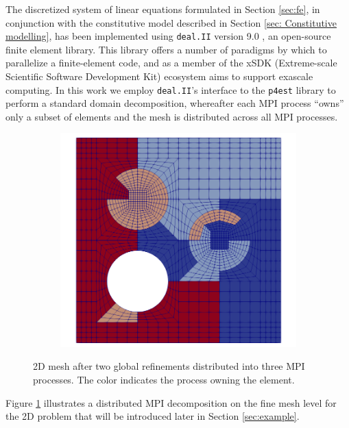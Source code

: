 \documentclass[AMA,STIX1COL]{WileyNJD-v2}
\begin{document}
The discretized system of linear equations formulated in Section \ref{sec:fe}, in conjunction with the constitutive model described in Section \ref{sec: Constitutive modelling}, has been implemented using \texttt{deal.II} version 9.0 \cite{dealII90}, an open-source finite element library.
This library offers a number of paradigms by which to parallelize a finite-element code, and as a member of the xSDK (Extreme-scale Scientific Software Development Kit) ecosystem \citep{Bartlett2017b} aims to support exascale computing.
In this work we employ \texttt{deal.II}'s interface to the \texttt{p4est} \cite{p4est} library to perform a standard domain decomposition, whereafter each MPI process ``owns'' only a subset of elements and the mesh is distributed across all MPI processes.
%
\begin{figure}[!ht]
  \centering
  \begin{subfigure}[b]{0.4\textwidth}
    \centering
    \includegraphics[width=\textwidth]{fine_level_2d.png}
  \end{subfigure}
  \caption{2D mesh after two global refinements distributed into three MPI processes. The color indicates the process owning the element.}%
  \label{fig:miehe_fine_level}
\end{figure}
%
%
Figure \ref{fig:miehe_fine_level} illustrates a distributed MPI decomposition on the fine mesh level for the 2D problem that will be introduced later in Section \ref{sec:example}.
\end{document}
